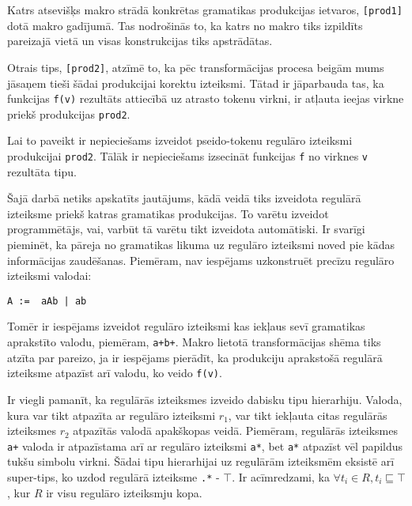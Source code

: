 Katrs atsevišķs makro strādā konkrētas gramatikas produkcijas ietvaros, \verb|[prod1]| dotā makro gadījumā. Tas nodrošinās to, ka katrs no makro tiks izpildīts pareizajā vietā un visas konstrukcijas tiks apstrādātas. 


Otrais tips, \verb|[prod2]|, atzīmē to, ka pēc transformācijas procesa beigām mums jāsaņem tieši šādai produkcijai korektu izteiksmi. Tātad ir jāparbauda tas, ka funkcijas \verb|f(v)| rezultāts attiecībā uz atrasto tokenu virkni, ir atļauta ieejas virkne priekš produkcijas \verb|prod2|.

Lai to paveikt ir nepieciešams izveidot pseido-tokenu regulāro izteiksmi produkcijai \verb|prod2|. Tālāk ir nepieciešams izsecināt funkcijas \verb|f| no virknes \verb|v| rezultāta tipu.

Šajā darbā netiks apskatīts jautājums, kādā veidā tiks izveidota regulārā izteiksme priekš katras gramatikas produkcijas. To varētu izveidot programmētājs, vai, varbūt tā varētu tikt izveidota automātiski. Ir svarīgi pieminēt, ka pāreja no gramatikas likuma uz regulāro izteiksmi noved pie kādas informācijas zaudēšanas. Piemēram, nav iespējams uzkonstruēt precīzu regulāro izteiksmi valodai:

\begin{verbatim}
A :=  aAb | ab
\end{verbatim}

Tomēr ir iespējams izveidot regulāro izteiksmi kas iekļaus sevī gramatikas aprakstīto valodu, piemēram, \verb|a+b+|. Makro lietotā transformācijas shēma tiks atzīta par pareizo, ja ir iespējams pierādīt, ka produkciju aprakstošā regulārā izteiksme atpazīst arī valodu, ko veido \verb|f(v)|.

Ir viegli pamanīt, ka regulārās izteiksmes izveido dabisku tipu hierarhiju. Valoda, kura var tikt atpazīta ar regulāro izteiksmi $r_1$, var tikt iekļauta citas regulārās izteiksmes $r_2$ atpazītās valodā apakškopas veidā. Piemēram, regulārās izteiksmes \verb|a+| valoda ir atpazīstama arī ar regulāro izteiksmi \verb|a*|, bet \verb|a*| atpazīst vēl papildus tukšu simbolu virkni. Šādai tipu hierarhijai uz regulārām izteiksmēm eksistē arī super-tips, ko uzdod regulārā izteiksme \verb|.*| - $\top$. Ir acīmredzami, ka $\forall t_i \in R, t_i \sqsubseteq \top$, kur $R$ ir visu regulāro izteiksmju kopa.

